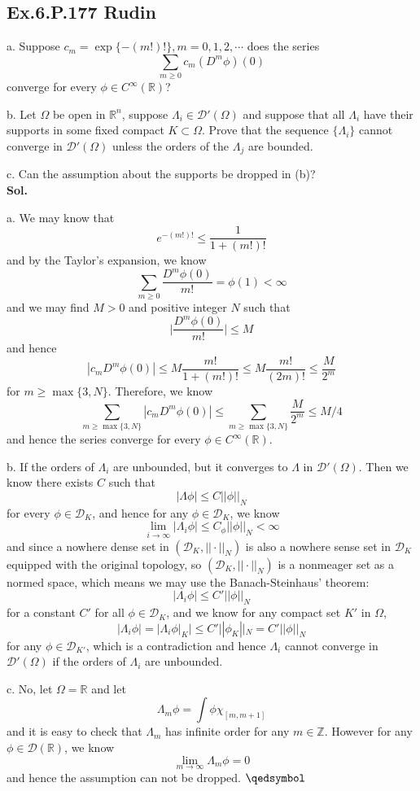 \documentclass[lang=en,11pt,a4paper,citestyle =authoryear]{elegantpaper}
\newcommand{\prvd}{$\hfill \qedsymbol$}
\newcommand{\Z}{\mathbb{Z}}
\newcommand{\R}{\mathbb{R}}
\begin{document}
\subsection*{Ex.6.P.177 Rudin} 
a. Suppose $c_m = \exp\{-(m!)!\}, m = 0,1,2,\cdots$ does the series 
\[\sum\limits_{m\geq 0}c_m(D^m \phi)(0)\]
converge for every $\phi \in C^{\infty}(\R)$?\par
b. Let $\Omega$ be open in $\R^n$, suppose $\Lambda_i \in \mathscr{D}'(\Omega)$ and suppose that all $\Lambda_i$ have their supports in some fixed compact $K\subset \Omega$. Prove that the sequence $\{\Lambda_i\}$ cannot converge in $\mathscr{D}'(\Omega)$ unless the orders of the $\Lambda_j$ are bounded.\par
c. Can the assumption about the supports be dropped in (b)? 
\vspace{0.5em}\\
\textbf{Sol.} \par
a. We may know that
\[e^{-(m!)!} \leq \dfrac{1}{1+(m!)!}\]
and by the Taylor's expansion, we know
\[
\sum\limits_{m\geq 0}\dfrac{D^m\phi(0)}{m!} = \phi(1) < \infty
\]
and we may find $M>0$ and positive integer $N$ such that
\[
\Big|\dfrac{D^m\phi(0)}{m!}\Big| \leq M
\]
and hence
\[
|c_mD^m\phi(0)| \leq M\dfrac{m!}{1+(m!)!} \leq M\dfrac{m!}{(2m)!} \leq \dfrac{M}{2^m}
\]
for $m\geq \max\{3,N\}$. Therefore, we know
\[
\sum\limits_{m\geq \max\{3,N\}}  |c_mD^m\phi(0)| \leq \sum\limits_{m\geq \max\{3,N\}} \dfrac{M}{2^m} \leq M/4
\]
and hence the series converge for every $\phi \in C^{\infty}(\R)$.\par
b. If the orders of $\Lambda_i$ are unbounded, but it converges to $\Lambda$ in $\mathscr{D}'(\Omega)$. Then we know there exists $C$ such that
\[|\Lambda \phi| \leq C||\phi||_N\]
for every $\phi \in \mathscr{D}_K$, and hence for any $\phi \in \mathscr{D}_K$, we know
\[
\lim_{i\to\infty}|\Lambda_i \phi| \leq C_{\phi}||\phi||_N < \infty
\]
and since a nowhere dense set in $(\mathscr{D}_K,||\cdot||_N)$ is also a nowhere sense set in $\mathscr{D}_K$ equipped with the original topology, so $(\mathscr{D}_K,||\cdot||_N)$ is a nonmeager set as a normed space, which means we may use the Banach-Steinhaus' theorem:
\[
|\Lambda_i \phi| \leq C'||\phi||_N
\]
for a constant $C'$ for all $\phi \in \mathscr{D}_K$, and we know for any compact set $K'$ in $\Omega$,
\[
|\Lambda_i \phi| = |\Lambda_i \phi|_K| \leq C'||\phi_K||_N = C'||\phi||_N 
\]
for any $\phi \in \mathscr{D}_{K'}$, which is a contradiction and hence $\Lambda_i$ cannot converge in $\mathscr{D}'(\Omega)$ if the orders of $\Lambda_i$ are unbounded.\par
c. No, let $\Omega = \R$ and let
\[\Lambda_m \phi = \int \phi\chi_{[m,m+1]}\]
and it is easy to check that $\Lambda_m$ has infinite order for any $m\in \Z$. However for any $\phi\in\mathscr{D}(\R)$, we know
\[\lim_{m\to\infty} \Lambda_m \phi = 0\]
and hence the assumption can not be dropped.
\prvd
\end{document}
